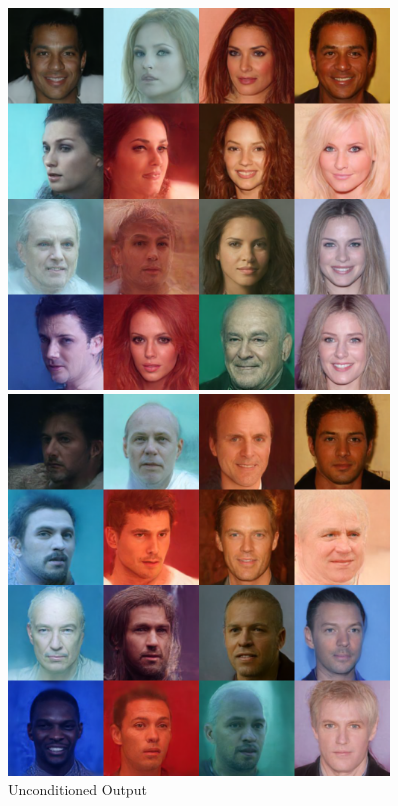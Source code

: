 \documentclass[conference]{IEEEtran}
\begin{document}
\begin{figure}[H]
   \begin{minipage}{0.33\textwidth}
    \centering
    \includegraphics[width=0.9\textwidth]{figures/figure6_unconditioned.png}
    \caption{Unconditioned Output} \label{fig:unconditioned}
   \end{minipage}
   \begin{minipage}{0.33\textwidth}
    \centering
    \includegraphics[width=0.9\textwidth]{figures/figure7_male_cond.png}

\end{minipage}
\end{figure}
\end{document}
